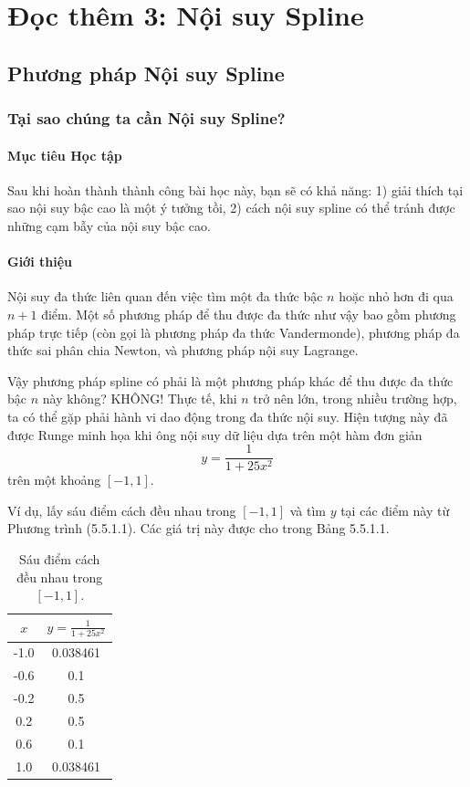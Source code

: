 \chapter{Đọc thêm 3: Nội suy Spline}
\label{ch:M1L3-reading}

\section{Phương pháp Nội suy Spline}

\subsection{Tại sao chúng ta cần Nội suy Spline?}

\subsubsection{Mục tiêu Học tập}
Sau khi hoàn thành thành công bài học này, bạn sẽ có khả năng:
1) giải thích tại sao nội suy bậc cao là một ý tưởng tồi,
2) cách nội suy spline có thể tránh được những cạm bẫy của nội suy bậc cao.

\subsubsection{Giới thiệu}
Nội suy đa thức liên quan đến việc tìm một đa thức bậc $n$ hoặc nhỏ hơn đi qua $n+1$ điểm. Một số phương pháp để thu được đa thức như vậy bao gồm phương pháp trực tiếp (còn gọi là phương pháp đa thức Vandermonde), phương pháp đa thức sai phân chia Newton, và phương pháp nội suy Lagrange.

Vậy phương pháp spline có phải là một phương pháp khác để thu được đa thức bậc $n$ này không? KHÔNG!
Thực tế, khi $n$ trở nên lớn, trong nhiều trường hợp, ta có thể gặp phải hành vi dao động trong đa thức nội suy. Hiện tượng này đã được Runge minh họa khi ông nội suy dữ liệu dựa trên một hàm đơn giản
\begin{equation}
y=\frac{1}{1+25x^{2}}
\end{equation}
trên một khoảng $[-1,1]$.

Ví dụ, lấy sáu điểm cách đều nhau trong $[-1,1]$ và tìm $y$ tại các điểm này từ Phương trình (5.5.1.1). Các giá trị này được cho trong Bảng 5.5.1.1.

\begin{table}[h]
\centering
\begin{tabular}{|c|c|}
\hline
$x$ & $y=\frac{1}{1+25x^{2}}$ \\
\hline
-1.0 & 0.038461 \\
-0.6 & 0.1 \\
-0.2 & 0.5 \\
0.2 & 0.5 \\
0.6 & 0.1 \\
1.0 & 0.038461 \\
\hline
\end{tabular}
\caption{Sáu điểm cách đều nhau trong $[-1,1]$.}
\end{table}

